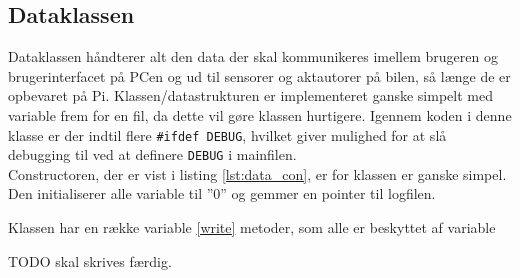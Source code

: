 \subsection{Dataklassen}

Dataklassen håndterer alt den data der skal kommunikeres imellem brugeren og brugerinterfacet på PCen og ud til sensorer og aktautorer på bilen, så længe de er opbevaret på Pi. Klassen/datastrukturen er implementeret ganske simpelt med variable frem for en fil, da dette vil gøre klassen hurtigere. Igennem koden i denne klasse er der indtil flere \texttt{\#ifdef DEBUG}, hvilket giver mulighed for at slå debugging til ved at definere \texttt{DEBUG} i mainfilen. \\
Constructoren, der er vist i listing \ref{lst:data_con}, er for klassen er ganske simpel. Den initialiserer alle variable til ''0'' og gemmer en pointer til logfilen.



Klassen har en række variable \ref{write} metoder, som alle er beskyttet af variable

TODO skal skrives færdig.